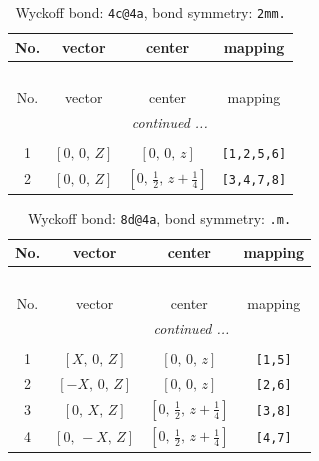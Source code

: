 \documentclass[fleqn,8pt]{jsarticle}
\begin{document}
\renewcommand{\arraystretch}{1.2}
\begin{longtable}{cccc}
\caption{Wyckoff bond: {\tt 4c@4a}, bond symmetry: {\tt 2mm.}}
 \\
 \hline \hline
No. & vector & center & mapping \\ \hline \endfirsthead

\multicolumn{3}{l}{\tablename\ \thetable{}} \\
 \hline \hline
No. & vector & center & mapping \\ \hline \endhead

 \hline \hline
\multicolumn{3}{r}{\footnotesize\it continued ...} \\ \endfoot

 \hline \hline
\multicolumn{3}{r}{} \\ \endlastfoot

1 & $\left[ 0,\, 0,\, Z \right]$ & $\left[ 0,\, 0,\, z \right]$ & {\tt [1,2,5,6]} \\ \hline
2 & $\left[ 0,\, 0,\, Z \right]$ & $\left[ 0,\, \frac{1}{2},\, z + \frac{1}{4} \right]$ & {\tt [3,4,7,8]} \\
\end{longtable}
\renewcommand{\arraystretch}{1.2}
\begin{longtable}{cccc}
\caption{Wyckoff bond: {\tt 8d@4a}, bond symmetry: {\tt .m.}}
 \\
 \hline \hline
No. & vector & center & mapping \\ \hline \endfirsthead

\multicolumn{3}{l}{\tablename\ \thetable{}} \\
 \hline \hline
No. & vector & center & mapping \\ \hline \endhead

 \hline \hline
\multicolumn{3}{r}{\footnotesize\it continued ...} \\ \endfoot

 \hline \hline
\multicolumn{3}{r}{} \\ \endlastfoot

1 & $\left[ X,\, 0,\, Z \right]$ & $\left[ 0,\, 0,\, z \right]$ & {\tt [1,5]} \\ \hline
2 & $\left[ - X,\, 0,\, Z \right]$ & $\left[ 0,\, 0,\, z \right]$ & {\tt [2,6]} \\ \hline
3 & $\left[ 0,\, X,\, Z \right]$ & $\left[ 0,\, \frac{1}{2},\, z + \frac{1}{4} \right]$ & {\tt [3,8]} \\ \hline
4 & $\left[ 0,\, - X,\, Z \right]$ & $\left[ 0,\, \frac{1}{2},\, z + \frac{1}{4} \right]$ & {\tt [4,7]} \\
\end{longtable}
\end{document}
